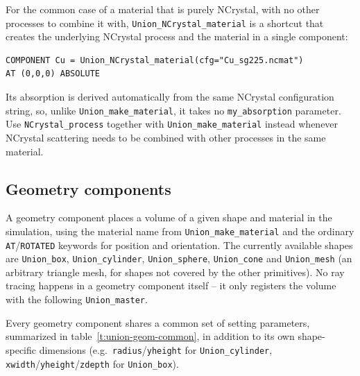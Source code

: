 For the common case of a material that is purely NCrystal, with no other
processes to combine it with, \texttt{Union\_NCrystal\_material} is a
shortcut that creates the underlying NCrystal process and the material in
a single component:
\begin{lstlisting}
COMPONENT Cu = Union_NCrystal_material(cfg="Cu_sg225.ncmat")
AT (0,0,0) ABSOLUTE
\end{lstlisting}
Its absorption is derived automatically from the same NCrystal
configuration string, so, unlike \texttt{Union\_make\_material}, it takes
no \texttt{my\_absorption} parameter. Use \texttt{NCrystal\_process}
together with \texttt{Union\_make\_material} instead whenever NCrystal
scattering needs to be combined with other processes in the same material.

\subsection{Geometry components}
\label{sec:union-geometry}

A geometry component places a volume of a given shape and material in the
simulation, using the material name from \texttt{Union\_make\_material}
and the ordinary \texttt{AT}/\texttt{ROTATED} keywords for position and
orientation. The currently available shapes are \texttt{Union\_box},
\texttt{Union\_cylinder}, \texttt{Union\_sphere}, \texttt{Union\_cone} and
\texttt{Union\_mesh} (an arbitrary triangle mesh, for shapes not covered by
the other primitives). No ray tracing happens in a geometry component
itself -- it only registers the volume with the following
\texttt{Union\_master}.

Every geometry component shares a common set of setting parameters,
summarized in table~\ref{t:union-geom-common}, in addition to its own
shape-specific dimensions (e.g.\ \texttt{radius}/\texttt{yheight} for
\texttt{Union\_cylinder}, \texttt{xwidth}/\texttt{yheight}/\texttt{zdepth}
for \texttt{Union\_box}).


